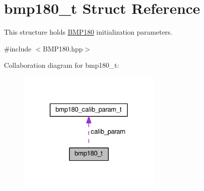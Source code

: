 \hypertarget{structbmp180__t}{}\section{bmp180\+\_\+t Struct Reference}
\label{structbmp180__t}


This structure holds \hyperlink{classBMP180}{B\+M\+P180} initialization parameters.  




{\ttfamily \#include $<$B\+M\+P180.\+hpp$>$}



Collaboration diagram for bmp180\+\_\+t\+:\nopagebreak
\begin{figure}[H]
\begin{center}
\leavevmode
\includegraphics[width=197pt]{structbmp180__t__coll__graph}
\end{center}
\end{figure}
